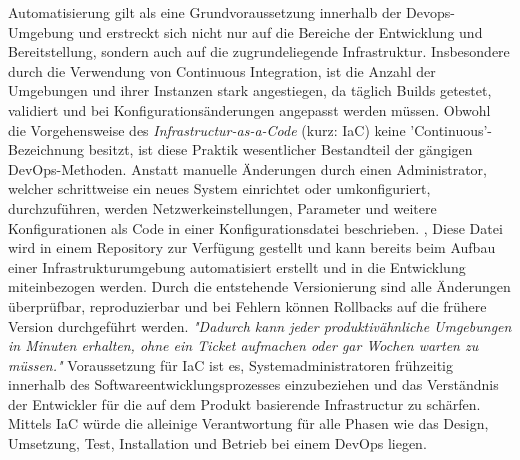 Automatisierung gilt als eine Grundvoraussetzung innerhalb der Devops-Umgebung und erstreckt sich nicht nur auf die Bereiche der Entwicklung und Bereitstellung, sondern auch auf die zugrundeliegende Infrastruktur. \cite[S. 272]{tiemeyer_handbuch_2021} Insbesondere durch die Verwendung von Continuous Integration, ist die Anzahl der Umgebungen und ihrer Instanzen stark angestiegen, da täglich Builds getestet, validiert und bei Konfigurationsänderungen angepasst werden müssen. \cite[S. 19]{sharma_devops_2017} Obwohl die Vorgehensweise des \textit{Infrastructur-as-a-Code} (kurz: IaC) keine 'Continuous'- Bezeichnung besitzt, ist diese Praktik wesentlicher Bestandteil der gängigen DevOps-Methoden. \cite[S. 30]{alt_innovationsorientiertes_2017} Anstatt manuelle Änderungen durch einen Administrator, welcher schrittweise ein neues System einrichtet oder umkonfiguriert, durchzuführen, werden Netzwerkeinstellungen, Parameter und weitere Konfigurationen als Code in einer Konfigurationsdatei beschrieben. \cite{juner_praxisbasierte_2017}, \cite{luber_was_2020} Diese Datei wird in einem Repository zur Verfügung gestellt und kann bereits beim Aufbau einer Infrastrukturumgebung automatisiert erstellt und in die Entwicklung miteinbezogen werden. Durch die entstehende Versionierung sind alle Änderungen überprüfbar, reproduzierbar und bei Fehlern können Rollbacks auf die frühere Version durchgeführt werden.\cite[S. 272]{tiemeyer_handbuch_2021} \textit{"Dadurch kann jeder produktivähnliche Umgebungen in Minuten erhalten, ohne ein Ticket aufmachen oder gar Wochen warten zu müssen."} \cite[S. 107]{kim_devops-handbuch_2017} Voraussetzung für IaC ist es, Systemadministratoren frühzeitig innerhalb des Softwareentwicklungsprozesses einzubeziehen und das Verständnis der Entwickler für die auf dem Produkt basierende Infrastructur zu schärfen. \cite[S. 30]{alt_innovationsorientiertes_2017} Mittels IaC würde die alleinige Verantwortung für alle Phasen wie das Design, Umsetzung, Test, Installation und Betrieb bei einem DevOps liegen. \cite{kasteleiner_devops_2019}









